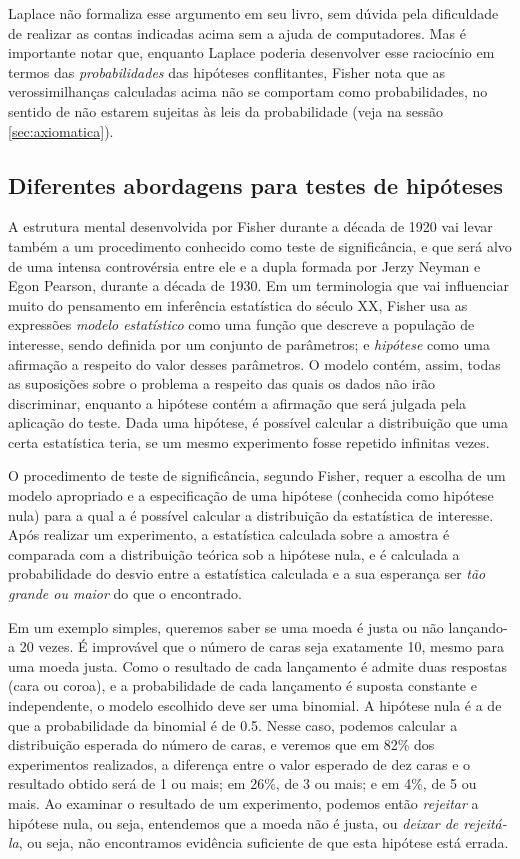 \documentclass[12pt,a4paper]{article}
\begin{document}
Laplace não formaliza esse argumento em seu livro, sem dúvida pela dificuldade de realizar as contas indicadas acima sem
a ajuda de computadores. Mas é importante notar que, enquanto Laplace poderia desenvolver esse raciocínio em termos das 
{\em probabilidades} das hipóteses conflitantes, Fisher nota que as verossimilhanças calculadas acima não se comportam como 
probabilidades, no sentido de não estarem sujeitas às leis da probabilidade (veja na sessão \ref{sec:axiomatica}).

\subsection{Diferentes abordagens para testes de hipóteses}

A estrutura mental desenvolvida por Fisher durante a década de 1920 vai levar também a um procedimento conhecido como teste de 
significância, e que será alvo de uma intensa controvérsia entre ele e a dupla formada por Jerzy Neyman e Egon Pearson, 
durante a década de 1930. Em um terminologia que vai influenciar muito do pensamento em inferência estatística do século XX,
Fisher usa as expressões {\em modelo estatístico} como uma função que descreve a população de interesse, sendo definida 
por um conjunto de parâmetros; e {\em hipótese} como uma afirmação a respeito do valor desses parâmetros. O modelo contém, 
assim, todas as suposições sobre o problema a respeito das quais os dados não irão discriminar, enquanto a hipótese
contém a afirmação que será julgada pela aplicação do teste. Dada uma hipótese, é possível
calcular a distribuição que uma certa estatística teria, se um mesmo experimento fosse repetido infinitas vezes.

O procedimento de teste de significância, segundo Fisher, requer a escolha de um modelo apropriado e a especificação de uma 
hipótese (conhecida como hipótese nula) para a qual a é possível calcular a distribuição da estatística de interesse. 
Após realizar um experimento, a estatística calculada sobre a amostra é comparada com a distribuição teórica sob a hipótese nula,
e é calculada a probabilidade do desvio entre a estatística calculada e a sua esperança ser {\em tão grande ou maior} do que o
encontrado. 

Em um exemplo simples, queremos saber se uma moeda é justa ou não lançando-a 20 vezes. É improvável que o número de caras seja
exatamente 10, mesmo para uma moeda justa. Como o resultado de cada lançamento é
admite duas	respostas (cara ou coroa), e a probabilidade de cada lançamento é suposta constante e independente, o modelo escolhido
deve ser uma binomial. A hipótese nula é a de que a probabilidade da binomial é de 0.5. Nesse caso, podemos calcular a 
distribuição esperada do número de caras, e veremos que em 82\% dos experimentos realizados, a diferença entre o valor esperado
de dez caras e o resultado obtido será de 1 ou mais; em 26\%, de 3 ou mais; e em 4\%, de 5 ou mais. Ao examinar o resultado 
de um experimento, podemos então {\em rejeitar} a hipótese nula, ou seja, entendemos que a moeda não é justa, ou {\em deixar
de rejeitá-la}, ou seja, não encontramos evidência suficiente de que esta hipótese está errada.
\end{document}

